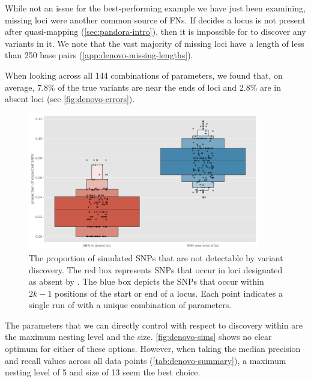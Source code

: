 While not an issue for the best-performing example we have just been examining, missing loci were another common source of FNs. If \pandora{} decides a locus is not present after quasi-mapping (\autoref{sec:pandora-intro}), then it is impossible for \denovo{} to discover any variants in it. We note that the vast majority of missing loci have a length of less than 250 base pairs (\autoref{app:denovo-missing-lengths}).

When looking across all 144 combinations of parameters, we found that, on average, 7.8\% of the true variants are near the ends of loci and 2.8\% are in absent loci (see \autoref{fig:denovo-errors}). 

\begin{figure}
    \centering
    \includegraphics[width=0.9\textwidth]{Chapter1/Figs/denovo_errors.png}
    \caption{The proportion of simulated SNPs that are not detectable by \denovo{} variant discovery. The red box represents SNPs that occur in loci designated as absent by \pandora{}. The blue box depicts the SNPs that occur within $2k-1$ positions of the start or end of a locus. Each point indicates a single run of \pandora{} with a unique combination of parameters.}
    \label{fig:denovo-errors}
\end{figure}

\noindent
The parameters that we can directly control with respect to \denovo{} discovery within \pandora{} are the \prg{} maximum nesting level and the \denovo{} \kmer{} size. \autoref{fig:denovo-sims} shows no clear optimum for either of these options. However, when taking the median precision and recall values across all data points (\autoref{tab:denovo-summary}), a maximum nesting level of 5 and \denovo{} \kmer{} size of 13 seem the best choice.

